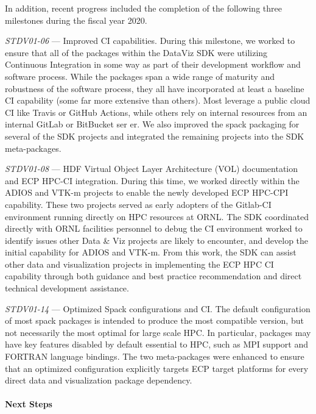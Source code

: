In addition, recent progress included the completion of the following three milestones during the fiscal year 2020.

\textit{STDV01-06} --- Improved CI capabilities. During this milestone, we worked to ensure that all of the packages within the DataViz SDK were utilizing Continuous Integration in some way as part of their development workflow and software process. While the packages span a wide range of maturity and robustness of the software process, they all have incorporated at least a baseline CI capability (some far more extensive than others). Most leverage a public cloud CI like Travis or GitHub Actions, while others rely on internal resources from an internal GitLab or BitBucket ser er. We also improved the spack packaging for several of the SDK projects and integrated the remaining projects into the SDK meta-packages.

\textit{STDV01-08} --- HDF Virtual Object Layer Architecture (VOL) documentation and ECP HPC-CI integration. During this time, we worked directly within the ADIOS and VTK-m projects to enable the newly developed ECP HPC-CPI capability. These two projects served as early adopters of the Gitlab-CI environment running directly on HPC resources at ORNL. The SDK coordinated directly with ORNL facilities personnel to debug the CI environment worked to identify issues other Data \& Viz projects are likely to encounter, and develop the initial capability for ADIOS and VTK-m. From this work, the SDK can assist other data and visualization projects in implementing the ECP HPC CI capability through both guidance and best practice recommendation and direct technical development assistance.

\textit{STDV01-14} --- Optimized Spack configurations and CI. The default configuration of most spack packages is intended to produce the most compatible version, but not necessarily the most optimal for large scale HPC. In particular, packages may have key features disabled by default essential to HPC, such as MPI support and FORTRAN language bindings. The two meta-packages were enhanced to ensure that an optimized configuration explicitly targets ECP target platforms for every direct data and visualization package dependency.

\paragraph{\textbf{Next Steps}}
\paragraph{}

